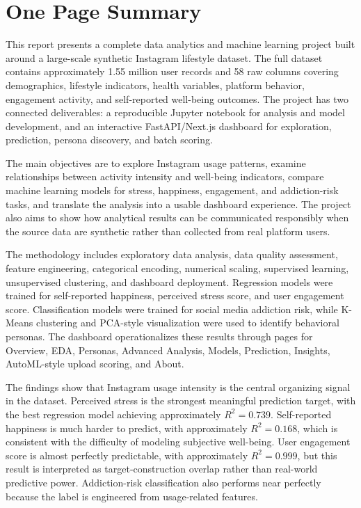 \documentclass[12pt,a4paper]{article}
\begin{document}

\section*{One Page Summary}

This report presents a complete data analytics and machine learning project built around a large-scale synthetic Instagram lifestyle dataset. The full dataset contains approximately 1.55 million user records and 58 raw columns covering demographics, lifestyle indicators, health variables, platform behavior, engagement activity, and self-reported well-being outcomes. The project has two connected deliverables: a reproducible Jupyter notebook for analysis and model development, and an interactive FastAPI/Next.js dashboard for exploration, prediction, persona discovery, and batch scoring.

The main objectives are to explore Instagram usage patterns, examine relationships between activity intensity and well-being indicators, compare machine learning models for stress, happiness, engagement, and addiction-risk tasks, and translate the analysis into a usable dashboard experience. The project also aims to show how analytical results can be communicated responsibly when the source data are synthetic rather than collected from real platform users.

The methodology includes exploratory data analysis, data quality assessment, feature engineering, categorical encoding, numerical scaling, supervised learning, unsupervised clustering, and dashboard deployment. Regression models were trained for self-reported happiness, perceived stress score, and user engagement score. Classification models were trained for social media addiction risk, while K-Means clustering and PCA-style visualization were used to identify behavioral personas. The dashboard operationalizes these results through pages for Overview, EDA, Personas, Advanced Analysis, Models, Prediction, Insights, AutoML-style upload scoring, and About.

The findings show that Instagram usage intensity is the central organizing signal in the dataset. Perceived stress is the strongest meaningful prediction target, with the best regression model achieving approximately $R^2 = 0.739$. Self-reported happiness is much harder to predict, with approximately $R^2 = 0.168$, which is consistent with the difficulty of modeling subjective well-being. User engagement score is almost perfectly predictable, with approximately $R^2 = 0.999$, but this result is interpreted as target-construction overlap rather than real-world predictive power. Addiction-risk classification also performs near perfectly because the label is engineered from usage-related features.
\end{document}
